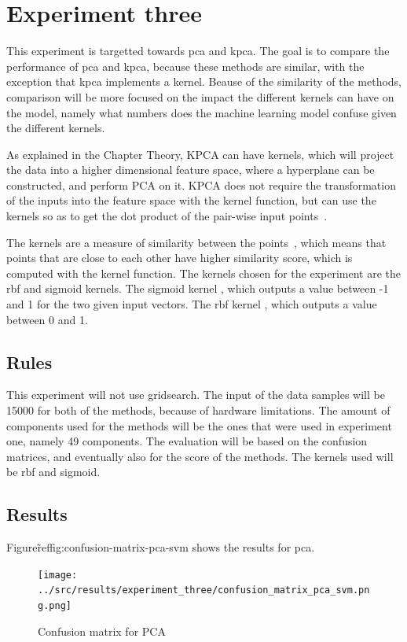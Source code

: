 
\section{Experiment three}
This experiment is targetted towards \gls{pca} and \gls{kpca}. The goal is to compare the performance of \gls{pca} and \gls{kpca}, because these methods are similar, with the exception that \gls{kpca} implements a kernel. Beause of the similarity of the methods, comparison will be more focused on the impact the different kernels can have on the model, namely what numbers does the machine learning model confuse given the different kernels.


As explained in the Chapter Theory, KPCA can have kernels, which will project the data into a higher dimensional feature space, where a hyperplane can be constructed, and perform PCA on it. KPCA does not require the transformation of the inputs into the feature space with the kernel function, but can use the kernels so as to get the dot product of the pair-wise input points~\cite{kpca-book}.


The kernels are a measure of similarity between the points~\cite{scikit-learn}, which means that points that are close to each other have higher similarity score, which is computed with the kernel function. The kernels chosen for the experiment are the \gls{rbf} and sigmoid kernels. The sigmoid kernel , which outputs a value between -1 and 1 for the two given input vectors. The \gls{rbf} kernel , which outputs a value between 0 and 1.


\subsection{Rules}
This experiment will not use gridsearch. The input of the data samples will be 15000 for both of the methods, because of hardware limitations. The amount of components used for the methods will be the ones that were used in experiment one, namely 49 components. The evaluation will be based on the confusion matrices, and eventually also for the score of the methods. The kernels used will be \gls{rbf} and sigmoid.


\subsection{Results}
Figure\~ref{fig:confusion-matrix-pca-svm} shows the results for \gls{pca}.
\begin{figure}[htb!]
    \centering
    \texttt{[image: ../src/results/experiment\_three/confusion\_matrix\_pca\_svm.png.png]}
    \caption{Confusion matrix for PCA}
    \label{fig:confusion-matrix-pca-svm}
\end{figure}


